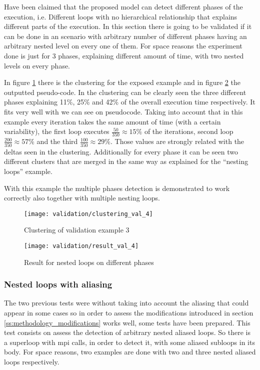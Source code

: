 Have been claimed that the proposed model can detect different phases of the
execution, i.e. Different loops with no hierarchical relationship that explains
different parts of the execution. In this section there is going to be validated
if it can be done in an scenario with arbitrary number of different phases having an
arbitrary nested level on every one of them. For space reasons the experiment
done is just for 3 phases, explaining different amount of time, with two nested 
levels on every phase.

In figure \ref{fig:clustering_val_4} there is the clustering for the exposed
example and in figure \ref{fig:result_val_4} the outputted pseudo-code. In the
clustering can be clearly seen the three different phases explaining 11\%, 25\%
and 42\% of the overall execution time respectively. It fits very well with we can
see on pseudocode. Taking into account that in this example every iteration
takes the same amount of time (with a certain variability), the first loop
executes $\frac{50}{350} \approx 15\%$ of the iterations, second loop 
$\frac{200}{350} \approx 57\%$ and the third $\frac{100}{350} \approx 29\%$.
Those values are strongly related with the deltas seen in the clustering. 
Additionally for every phase it can be seen two different clusters that are 
merged in the same way as explained for the ``nesting loops'' example.

With this example the multiple phases detection is demonstrated to work
correctly also together with multiple nesting loops.

\begin{figure}[H]
  \centering
  \texttt{[image: validation/clustering\_val\_4]}
  \caption{Clustering of validation example 3}
  \label{fig:clustering_val_4}
\end{figure}

\begin{figure}[H]
    \centering
    \texttt{[image: validation/result\_val\_4]}
    \caption{Result for nested loops on different phases}
    \label{fig:result_val_4}
\end{figure}

\subsubsection{Nested loops with aliasing}

The two previous tests were without taking into account the aliasing that could
appear in some cases so in order to assess the modifications introduced in
section \ref{ss:methodology_modifications} works well, some tests have been
prepared. This test consists on assess the detection of arbitrary nested
aliased loops. So there is a superloop with mpi calls, in order to detect it,
with some aliased subloops in its body. For space reasons, two examples are
done with two and three nested aliased loops respectively.

